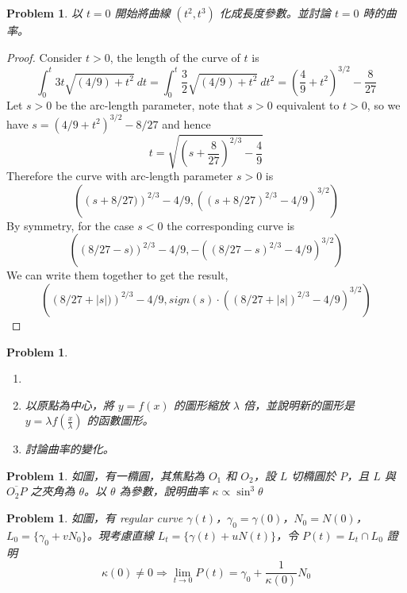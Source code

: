 \documentclass[10pt,a4paper]{article}
\newcounter{theProblemCounter}
\newtheorem{problem}[theProblemCounter]{Problem}
\begin{document}
\setcounter{theProblemCounter}{4}
\begin{problem}
以 $t=0$ 開始將曲線 $(t^2, t^3)$ 化成長度參數。並討論 $t=0$ 時的曲率。
\end{problem}

\begin{proof}
Consider $t>0$, the length of the curve of $t$ is
\begin{equation}
\int_0^t 3t\sqrt{(4/9)+t^2}\ dt = \int_0^t \frac32\sqrt{(4/9)+t^2}\ dt^2 = \left(\frac49+t^2\right)^{3/2}-\frac{8}{27}
\end{equation}
Let $s>0$ be the arc-length parameter, note that $s>0$ equivalent to $t>0$, so we have $s=(4/9+t^2)^{3/2}-8/27$ and hence
\begin{equation}
t = \sqrt{\left(s+\frac{8}{27}\right)^{2/3} - \frac{4}{9}}
\end{equation}
Therefore the curve with arc-length parameter $s>0$ is
\begin{equation}
\left(\left(s+8/27)\right)^{2/3} - 4/9, 
\left(\left(s+8/27\right)^{2/3} - 4/9\right)^{3/2}\right)
\end{equation}
By symmetry, for the case $s<0$ the corresponding curve is
\begin{equation}
\left(\left(8/27-s)\right)^{2/3} - 4/9, 
-\left(\left(8/27-s\right)^{2/3} - 4/9\right)^{3/2}\right)
\end{equation}
We can write them together to get the result,
\begin{equation}
\left(\left(8/27+|s|)\right)^{2/3} - 4/9, 
sign(s)\cdot\left(\left(8/27+|s|\right)^{2/3} - 4/9\right)^{3/2}\right)
\end{equation}

\end{proof}

\setcounter{theProblemCounter}{5}
\begin{problem}
\begin{enumerate}
\item[]
\item[(a)] 以原點為中心，將 $y=f(x)$ 的圖形縮放 $\lambda$ 倍，並說明新的圖形是 $y=\lambda f(\frac{x}{\lambda})$ 的函數圖形。
\item[(b)] 討論曲率的變化。
\end{enumerate}
\end{problem}

\setcounter{theProblemCounter}{6}
\begin{problem}
如圖，有一橢圓，其焦點為 $O_1$ 和 $O_2$，設 $L$ 切橢圓於 $P$，且 $L$ 與 $\overline{O_2P}$ 之夾角為 $\theta$。以 $\theta$ 為參數，說明曲率 $\kappa\propto\sin^3\theta$
\end{problem}

\setcounter{theProblemCounter}{8}
\begin{problem}
如圖，有 regular curve $\gamma(t)$，$\gamma_0=\gamma(0)$，$N_0=N(0)$，$L_0=\{\gamma_0+vN_0\}$。現考慮直線 $L_t=\{\gamma(t)+uN(t)\}$，令 $P(t)=L_t\cap L_0$ 證明
\[\kappa(0)\ne 0\Rightarrow \lim_{t\to 0}P(t)=\gamma_0 + \frac{1}{\kappa(0)}N_0\]
\end{problem}
\end{document}
